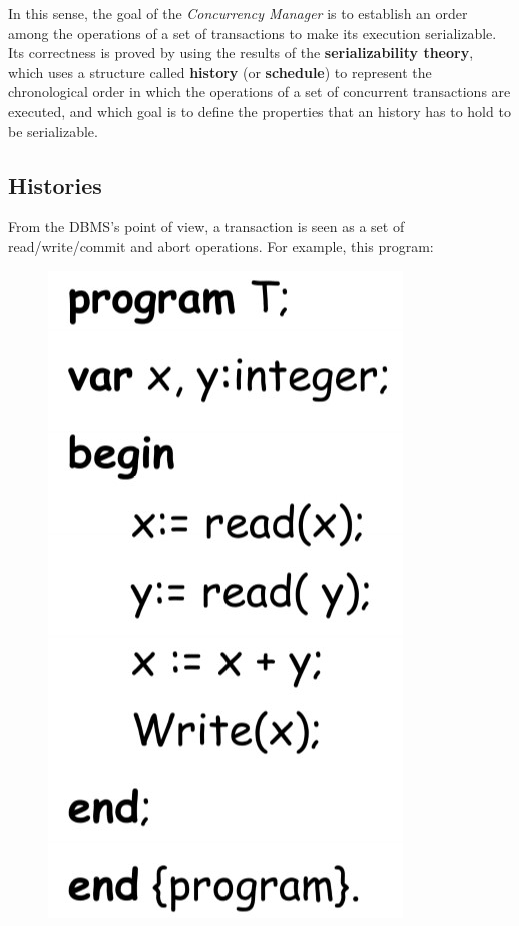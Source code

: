 In this sense, the goal of the \textit{Concurrency Manager} is to establish an order among the operations of a set of transactions to make its execution serializable. Its correctness is proved by using the results of the \textbf{serializability theory}, which uses a structure called \textbf{history} (or \textbf{schedule}) to represent the chronological order in which the operations of a set of concurrent transactions are executed, and which goal is to define the properties that an history has to hold to be serializable.

\subsection{Histories}
From the DBMS's point of view, a transaction is seen as a set of read/write/commit and abort operations. For example, this program:

\begin{figure}[h!]
		\centering
		\includegraphics[scale = 0.7]{img/conc2.jpg}
		\label{tr10}
\end{figure}

